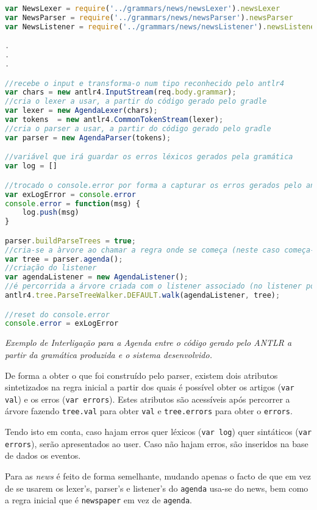 \begin{framed}
\begin{lstlisting}[language=JavaScript]
var NewsLexer = require('../grammars/news/newsLexer').newsLexer
var NewsParser = require('../grammars/news/newsParser').newsParser
var NewsListener = require('../grammars/news/newsListener').newsListener

.
.
.

//recebe o input e transforma-o num tipo reconhecido pelo antlr4
var chars = new antlr4.InputStream(req.body.grammar);
//cria o lexer a usar, a partir do código gerado pelo gradle
var lexer = new AgendaLexer(chars);
var tokens  = new antlr4.CommonTokenStream(lexer);
//cria o parser a usar, a partir do código gerado pelo gradle
var parser = new AgendaParser(tokens);

//variável que irá guardar os erros léxicos gerados pela gramática
var log = []

//trocado o console.error por forma a capturar os erros gerados pelo analisador léxico
var exLogError = console.error
console.error = function(msg) {
    log.push(msg)
}

parser.buildParseTrees = true;   
//cria-se a àrvore ao chamar a regra onde se começa (neste caso começa-se pela regra agenda)
var tree = parser.agenda();
//criação do listener
var agendaListener = new AgendaListener();
//é percorrida a árvore criada com o listener associado (no listener podia ser associado código à entrada e à saída das regras, o listener usado é o default que não possui nenhum código nessas fases)
antlr4.tree.ParseTreeWalker.DEFAULT.walk(agendaListener, tree);

//reset do console.error
console.error = exLogError
\end{lstlisting}
\end{framed}
\begin{center}
\textit{Exemplo de Interligação para a Agenda entre o código gerado pelo ANTLR a partir da gramática produzida e o sistema desenvolvido.}~\cite{AMT,MA,DOCA}
\end{center}

De forma a obter o que foi construído pelo parser, existem dois atributos sintetizados na regra inicial a partir dos quais é possível obter os artigos (\verb|var val|) e os erros (\verb|var errors|). Estes atributos são acessíveis após percorrer a árvore fazendo \verb|tree.val| para obter \verb|val| e \verb|tree.errors| para obter o \verb|errors|.

Tendo isto em conta, caso hajam erros quer léxicos (\verb|var log|) quer sintáticos (\verb|var errors|), serão apresentados ao user. Caso não hajam erros, são inseridos na base de dados os eventos.

Para as \textit{news} é feito de forma semelhante, mudando apenas o facto de que em vez de se usarem os lexer's, parser's e listener's do \texttt{agenda} usa-se do news, bem como a regra inicial que é \verb|newspaper| em vez de \verb|agenda|.